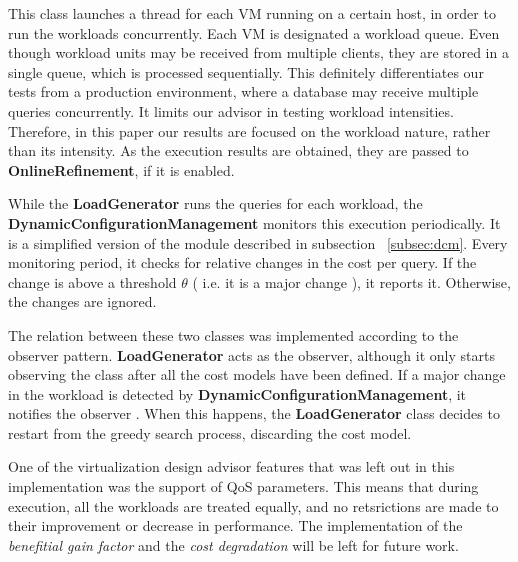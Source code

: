 This class launches a thread for each VM running on a certain host, in order to run the workloads concurrently. Each VM is designated a workload queue. Even though workload units may be received from multiple clients, they are stored in a single queue, which is processed sequentially. This definitely differentiates our tests from a production environment, where a database may receive multiple queries concurrently. It limits our advisor in testing workload intensities. Therefore, in this paper our results are focused on the workload nature, rather than its intensity. As the execution results are obtained, they are passed to \textbf{OnlineRefinement}, if it is enabled. 

While the \textbf{LoadGenerator} runs the queries for each workload, the \textbf{DynamicConfigurationManagement} monitors this execution periodically. 
It is a simplified version of the module described in subsection ~\ref{subsec:dcm}. Every monitoring period, it checks for relative changes in the cost per query. If the change is above a threshold $\theta$ ( i.e. it is a major change ), it reports it. Otherwise, the changes are ignored.

The relation between these two classes was implemented according to the observer pattern. \textbf{LoadGenerator} acts as the observer, although it only starts observing the class after all the cost models have been defined. If a major change in the workload is detected by \textbf{DynamicConfigurationManagement}, it notifies the observer . When this happens, the \textbf{LoadGenerator} class decides to restart from the greedy search process, discarding the cost model.

One of the virtualization design advisor  features that was left out in this implementation was the support of QoS parameters. This means that during execution, all the workloads are treated equally, and no retsrictions are made to their improvement or decrease in performance. The implementation of the \textit{benefitial gain factor} and the \textit{cost degradation} will be left for future work.





